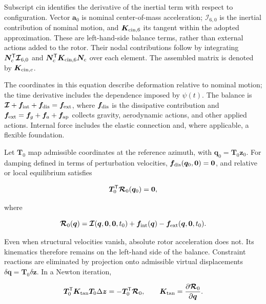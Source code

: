 Subscript $\mathrm{cin}$ identifies the derivative of the inertial term with respect to configuration. Vector $\bm a_0$ is nominal center-of-mass acceleration; $\bm{\mathcal I}_{6,0}$ is the inertial contribution of nominal motion, and $\bm K_{{\rm cin},6}$ its tangent within the adopted approximation. These are left-hand-side balance terms, rather than external actions added to the rotor. Their nodal contributions follow by integrating $\bm N_c^\mathsf T\bm{\mathcal I}_{6,0}$ and $\bm N_c^\mathsf T\bm K_{{\rm cin},6}\bm N_c$ over each element. The assembled matrix is denoted by $\bm K_{{\rm cin},c}$.

The coordinates in this equation describe deformation relative to nominal motion; the time derivative includes the dependence imposed by $\psi(t)$. The balance is $\bm{\mathcal I}+\bm f_{\rm int}+\bm f_{\rm dis}=\bm f_{\rm ext}$, where $\bm f_{\rm dis}$ is the dissipative contribution and $\bm f_{\rm ext}=\bm f_g+\bm f_a+\bm f_{\rm ap}$ collects gravity, aerodynamic actions, and other applied actions. Internal force includes the elastic connection and, where applicable, a flexible foundation.

Let $\bm T_0$ map admissible coordinates at the reference azimuth, with $\bm q_0=\bm T_0\bm z_0$. For damping defined in terms of perturbation velocities, $\bm f_{\rm dis}(\bm q_0,\bm0)=\bm0$, and relative or local equilibrium satisfies

\begin{equation}
\bm T_0^\mathsf T\bm{\mathcal R}_0(\bm q_0)=\bm0,
\label{eq:equilibrium}
\end{equation}

where

\begin{equation}
\bm{\mathcal R}_0(\bm q)=
\bm{\mathcal I}(\bm q,\bm0,\bm0,t_0)
+\bm f_{\rm int}(\bm q)-\bm f_{\rm ext}(\bm q,\bm0,t_0).
\end{equation}

Even when structural velocities vanish, absolute rotor acceleration does not. Its kinematics therefore remains on the left-hand side of the balance. Constraint reactions are eliminated by projection onto admissible virtual displacements $\delta\bm q=\bm T_0\delta\bm z$. In a Newton iteration,

\begin{equation}
\bm T_0^\mathsf T\bm K_{\rm tan}\bm T_0\Delta\bm z
=-\bm T_0^\mathsf T\bm{\mathcal R}_0,\qquad
\bm K_{\rm tan}=\frac{\partial\bm{\mathcal R}_0}{\partial\bm q}.
\end{equation}

